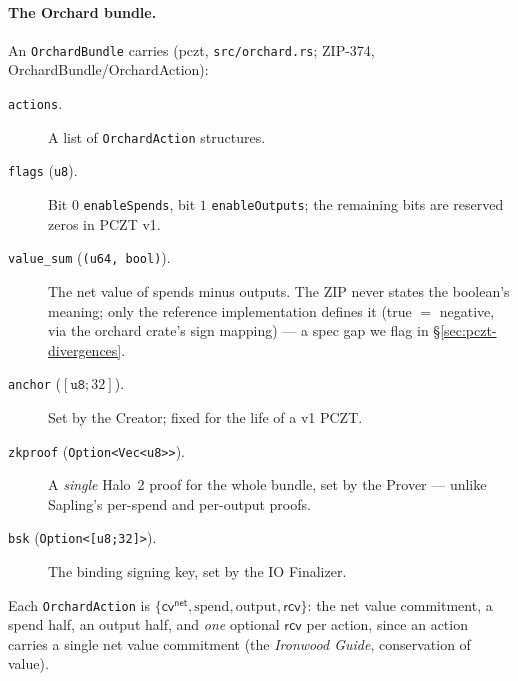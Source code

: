 \documentclass[11pt,a4paper]{article}
\theoremstyle{definition}
\newcommand{\cvsym}{\mathsf{cv}}
\newcommand{\rcv}{\ensuremath{\mathsf{rcv}}}
\begin{document}
\paragraph{The Orchard bundle.} An \texttt{OrchardBundle} carries
(\textsf{pczt}, \texttt{src/orchard.rs}; ZIP-374,
OrchardBundle/OrchardAction):
\begin{description}
\item[\texttt{actions}.] A list of \texttt{OrchardAction} structures.
\item[\texttt{flags} (\texttt{u8}).] Bit $0$ \texttt{enableSpends}, bit
  $1$ \texttt{enableOutputs}; the remaining bits are reserved zeros in
  PCZT v1.
\item[\texttt{value\_sum} (\texttt{(u64, bool)}).] The net value of
  spends minus outputs. The ZIP never states the boolean's meaning; only
  the reference implementation defines it (true $=$ negative, via the
  \textsf{orchard} crate's sign mapping) --- a spec gap we flag in
  \S\ref{sec:pczt-divergences}.
\item[{\texttt{anchor} ($[\mathtt{u8};32]$)}.] Set by the Creator; fixed
  for the life of a v1 PCZT.
\item[{\texttt{zkproof} (\texttt{Option<Vec<u8>>})}.] A \emph{single}
  Halo~2 proof for the whole bundle, set by the Prover --- unlike
  Sapling's per-spend and per-output proofs.
\item[{\texttt{bsk} (\texttt{Option<[u8;32]>})}.] The binding signing key,
  set by the IO Finalizer.
\end{description}
Each \texttt{OrchardAction} is
$\{\cvsym^{\mathsf{net}}, \text{spend}, \text{output}, \rcv\}$: the net
value commitment, a spend half, an output half, and \emph{one} optional
$\rcv$ per action, since an action carries a single net value commitment
(the \emph{Ironwood Guide}, conservation of value).
\end{document}
